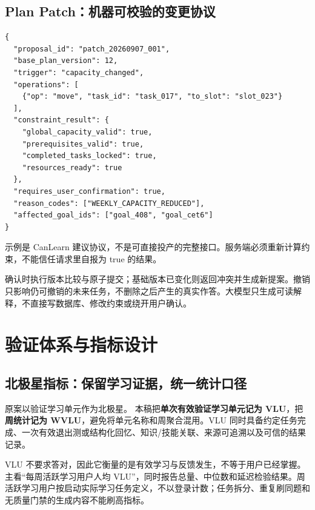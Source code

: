\documentclass[UTF8,a4paper,11pt,fontset=none]{ctexart}
\newcommand{\minor}[1]{{\small\color{Muted}#1}}
\newcommand{\newsec}[1]{\clearpage\section{#1}}
\begin{document}
\subsection{Plan Patch：机器可校验的变更协议}
\begin{lstlisting}
{
  "proposal_id": "patch_20260907_001",
  "base_plan_version": 12,
  "trigger": "capacity_changed",
  "operations": [
    {"op": "move", "task_id": "task_017", "to_slot": "slot_023"}
  ],
  "constraint_result": {
    "global_capacity_valid": true,
    "prerequisites_valid": true,
    "completed_tasks_locked": true,
    "resources_ready": true
  },
  "requires_user_confirmation": true,
  "reason_codes": ["WEEKLY_CAPACITY_REDUCED"],
  "affected_goal_ids": ["goal_408", "goal_cet6"]
}
\end{lstlisting}
\minor{示例是 CanLearn 建议协议，不是可直接投产的完整接口。服务端必须重新计算约束，不能信任请求里自报为 true 的结果。}

确认时执行版本比较与原子提交；基础版本已变化则返回冲突并生成新提案。撤销只影响仍可撤销的未来任务，不删除之后产生的真实作答。大模型只生成可读解释，不直接写数据库、修改约束或绕开用户确认。%
\newsec{验证体系与指标设计}
\subsection{北极星指标：保留学习证据，统一统计口径}
原案以验证学习单元作为北极星。\cite{original} 本稿把\textbf{单次有效验证学习单元记为 VLU}，把\textbf{周统计记为 WVLU}，避免将单元名称和周聚合混用。VLU 同时具备约定任务完成、一次有效退出测或结构化回忆、知识/技能关联、来源可追溯以及可信的结果记录。

VLU 不要求答对，因此它衡量的是有效学习与反馈发生，不等于用户已经掌握。主看“每周活跃学习用户人均 VLU”，同时报告总量、中位数和延迟检验结果。周活跃学习用户按启动实际学习任务定义，不以登录计数；任务拆分、重复刷同题和无质量门禁的生成内容不能刷高指标。
\end{document}

